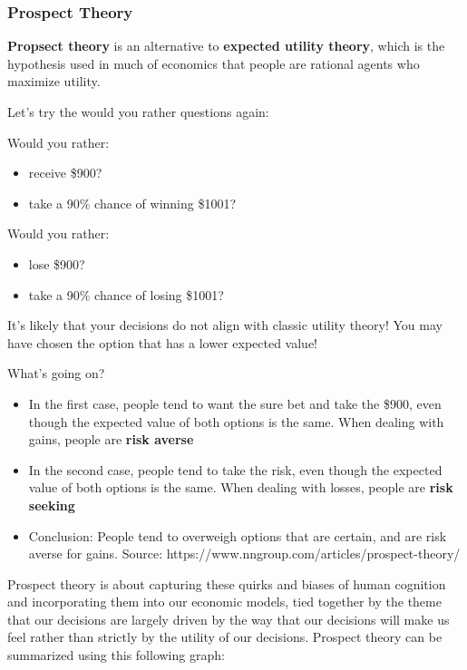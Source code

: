 \documentclass[11pt]{article}
\begin{document}
\subsubsection{Prospect Theory}
{\bf Propsect theory} is an alternative to {\bf expected utility theory}, which is the hypothesis used in much of economics that people are rational agents who maximize utility.

Let's try the would you rather questions again: 

Would you rather:
\begin{itemize}
    \item receive \$900?
    \item take a 90\% chance of winning \$1001?
\end{itemize}

Would you rather:
\begin{itemize}
    \item lose \$900?
    \item take a 90\% chance of losing \$1001?
\end{itemize}

It's likely that your decisions do not align with classic utility theory! You may have chosen the option that has a lower expected value! 


What's going on?
\begin{itemize}
    \item In the first case, people tend to want the sure bet and take the \$900, even though the expected value of both options is the same. When dealing with gains, people are {\bf risk averse}
    \item In the second case, people tend to take the risk, even though the expected value of both options is the same. When dealing with losses, people are {\bf risk seeking}
    \item Conclusion: People tend to overweigh options that are certain, and are risk averse for gains. Source: https://www.nngroup.com/articles/prospect-theory/
\end{itemize}

\FloatBarrier
Prospect theory is about capturing these quirks and biases of human cognition and incorporating them into our economic models, tied together by the theme that our decisions are largely driven by the way that our decisions will make us feel rather than strictly by the utility of our decisions.
Prospect theory can be summarized using this following graph:
\end{document}
